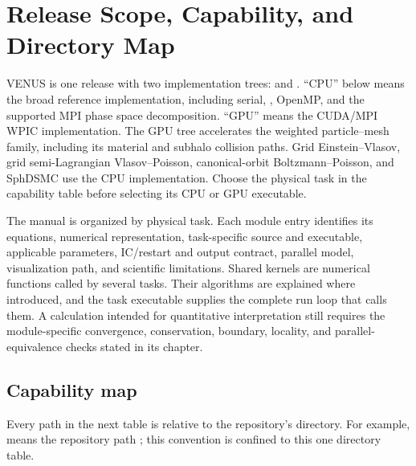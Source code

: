 \section{Release Scope, Capability, and Directory Map}

VENUS is one release with two implementation trees:
 and .  ``CPU'' below means the broad
reference implementation, including serial, , OpenMP, and
the supported MPI phase space decomposition.  ``GPU'' means the CUDA/MPI WPIC
implementation.  The GPU tree accelerates the weighted particle--mesh family, including its
material and subhalo collision paths. Grid Einstein--Vlasov, grid
semi-Lagrangian Vlasov--Poisson, canonical-orbit Boltzmann--Poisson, and
SphDSMC use the CPU implementation. Choose the physical task in the capability
table before selecting its CPU or GPU executable.

The manual is organized by physical task.  Each module entry identifies its
equations, numerical representation, task-specific source and executable,
applicable parameters, IC/restart and output contract, parallel model,
visualization path, and scientific limitations.  Shared kernels are numerical functions called by several tasks. Their
algorithms are explained where introduced, and the task executable supplies
the complete run loop that calls them.  A calculation intended for quantitative interpretation still
requires the module-specific convergence, conservation, boundary, locality,
and parallel-equivalence checks stated in its chapter.

\subsection{Capability map}

Every path in the next table is relative to the repository's
 directory.  For example,
 means the repository path
; this convention is confined to this one
directory table.

